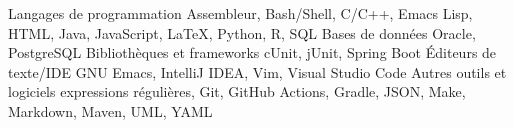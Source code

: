 

\begin{cvskills}

  \cvskill
    {Langages de programmation} %
    {Assembleur, Bash/Shell, C/C++, Emacs Lisp, HTML, Java, JavaScript, \LaTeX, Python, R, SQL} %
  \cvskill
    {Bases de données} %
    {Oracle, PostgreSQL} %
  \cvskill
    {Bibliothèques et frameworks} %
    {cUnit, jUnit, Spring Boot} %
  \cvskill
    {Éditeurs de texte/IDE} %
    {GNU Emacs, IntelliJ IDEA, Vim, Visual Studio Code} %
  \cvskill
    {Autres outils et logiciels} %
    {expressions régulières, Git, GitHub Actions, Gradle, JSON, Make, Markdown, Maven, UML, YAML} %

\end{cvskills}

